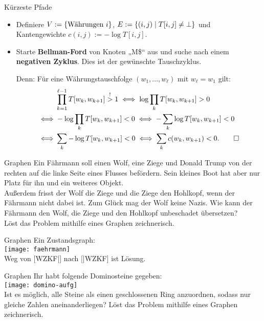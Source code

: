 \begin{frame}{Kürzeste Pfade}
	\solutionheading
	\begin{itemize}
		\item Definiere $V := \left\{\text{Währungen $i$}\right\}$, $E := \left\{(i, j) \;\middle|\; T[i,j] \neq \bot\right\}$ und Kantengewichte $c(i, j) := -\log T[i,j]$. 
		\pause
		\item Starte \textbf{Bellman-Ford} von Knoten „M\$“ aus und suche nach einem \textbf{negativen Zyklus}. Dies ist der gewünschte Tauschzyklus.
		\pause
		\item [Denn:\!] Für eine Währungstauschfolge $(w_1, ..., w_\ell)$ mit $w_\ell = w_1$ gilt: 
		\begin{align*}
			& \prod_{k = 1}^{{\ell-1}} T[w_k, w_{k+1}] \stackrel{!}{>} 1 \Gdw \log \prod_k T[w_k, w_{k+1}] > 0 \\ 
			{\Gdw} &-\log \prod_k T[w_k, w_{k+1}] < 0 \Gdw -\sum_k \log T[w_k, w_{k+1}] < 0 \\
			{\Gdw} & \sum_k -\log T[w_k, w_{k+1}] < 0 \Gdw \sum_k c(w_k, w_{k+1}) < 0. \qed
		\end{align*}
	\end{itemize}
\end{frame}

\begin{frame}{Graphen}
	Ein Fährmann soll einen Wolf, eine Ziege und Donald Trump von der rechten auf die linke Seite eines Flusses befördern. Sein kleines Boot hat aber nur Platz für ihn und ein weiteres Objekt. \\
	Außerdem frisst der Wolf die Ziege und die Ziege den Hohlkopf, wenn der Fährmann nicht dabei ist. Zum Glück mag der Wolf keine Nazis. Wie kann der Fährmann den Wolf, die Ziege und den Hohlkopf unbeschadet übersetzen? \\
	Löst das Problem mithilfe eines Graphen zeichnerisch.
\end{frame}

\begin{frame}{Graphen}
	\solutionheading
	Ein Zustandsgraph:  \\
	\texttt{[image: faehrmann]} \\
	Weg von [WZKF|] nach [|WZKF] ist Lösung.
\end{frame}

\begin{frame}{Graphen}
	Ihr habt folgende Dominosteine gegeben: \\
	\texttt{[image: domino-aufg]} \\
	Ist es möglich, alle Steine als einen geschlossenen Ring anzuordnen, sodass nur gleiche Zahlen aneinanderliegen? Löst das Problem mithilfe eines Graphen zeichnerisch.
\end{frame}

